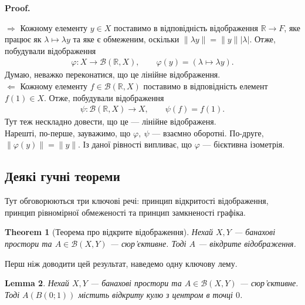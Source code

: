 \documentclass[a4paper, 10pt]{article}
\makeatletter
\def\rightproof{$\boxed{\Rightarrow}$ }
\def\leftproof{$\boxed{\Leftarrow}$ }
\theoremstyle{theoremdd}
\newtheorem{theorem}{Theorem}[subsection]
\theoremstyle{theoremdd}
\theoremstyle{theoremdd}
\theoremstyle{theoremdd}
\theoremstyle{theoremdd}
\theoremstyle{theoremdd}
\theoremstyle{theoremdd}
\newtheorem{lemma}[theorem]{Lemma}
\theoremstyle{theoremdd}
\renewenvironment{proof}[1][Proof.\\]{\par
\pushQED{\hfill \qed}%
\normalfont \topsep6\p@\@plus6\p@\relax
\trivlist
\item\relax
{\bfseries
#1\@addpunct{.}}\hspace\labelsep\ignorespaces
}{%
\popQED\endtrivlist\@endpefalse
}
\makeatother
\begin{document}
\begin{proof}
\rightproof Кожному елементу $y \in X$ поставимо в відповідність відображення $\mathbb{R} \to F$, яке працює як $\lambda \mapsto \lambda y$ та яке є обмеженим, оскільки $\| \lambda y\| = \|y\| |\lambda|$. Отже, побудували відображення
\begin{align*}
\varphi \colon X \to \mathcal{B}(\mathbb{R},X), \qquad \varphi(y) = (\lambda \mapsto \lambda y).
\end{align*}
Думаю, неважко переконатися, що це лінійне відображення.
\bigskip \\
\leftproof Кожному елементу $f \in \mathcal{B}(\mathbb{R},X)$ поставимо в відповідність елемент $f(1) \in X$. Отже, побудували відображення
\begin{align*}
\psi \colon \mathcal{B}(\mathbb{R},X) \to X,\qquad \psi(f) = f(1).
\end{align*}
Тут теж нескладно довести, що це --- лінійне відображеня.
\bigskip \\
Нарешті, по-перше, зауважимо, що $\varphi,\ \psi$ --- взаємно оборотні. По-друге, $\|\varphi(y)\| = \|y\|$. Із даної рівності випливає, що $\varphi$ --- бієктивна ізометрія.
\end{proof}

\subsection{Деякі гучні теореми}
Тут обговорюються три ключові речі: принцип відкритості відображення, принцип рівномірної обмеженості та принцип замкненості графіка.

\begin{theorem}[Теорема про відкрите відображення]
\label{open_mapping_theorem}
Нехай $X,Y$ --- банахові простори та $A \in \mathcal{B}(X,Y)$ --- сюр'єктивне. Тоді $A$ --- вікдрите відображення. 
\end{theorem}
\noindent
Перш ніж доводити цей результат, наведемо одну ключову лему.

\begin{lemma}
Нехай $X,Y$ --- банахові простори та $A \in \mathcal{B}(X,Y)$ --- сюр'єктивне. Тоді $A(B(0;1))$ містить відкриту кулю з центром в точці $0$. 
\end{lemma}
\end{document}
